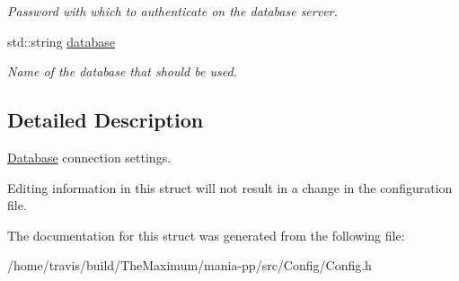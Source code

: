 \begin{DoxyCompactItemize}
\begin{DoxyCompactList}\small\item\em Password with which to authenticate on the database server. \end{DoxyCompactList}\item 
\hypertarget{structDatabaseConfig_a6d8841402f11c6f9406871b3b93f9363}{std\-::string \hyperlink{structDatabaseConfig_a6d8841402f11c6f9406871b3b93f9363}{database}}\label{structDatabaseConfig_a6d8841402f11c6f9406871b3b93f9363}

\begin{DoxyCompactList}\small\item\em Name of the database that should be used. \end{DoxyCompactList}\end{DoxyCompactItemize}


\subsection{Detailed Description}
\hyperlink{classDatabase}{Database} connection settings. 

Editing information in this struct will not result in a change in the configuration file. 

The documentation for this struct was generated from the following file\-:\begin{DoxyCompactItemize}
\item 
/home/travis/build/\-The\-Maximum/mania-\/pp/src/\-Config/Config.\-h\end{DoxyCompactItemize}
